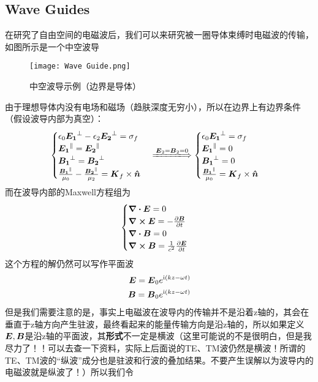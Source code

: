 \documentclass[14pt,oneside]{book}
\def \i{\mathrm{i}}
\def \E{\vb*{E}}
\def \B{\vb*{B}}
\begin{document}
\begin{large}
\subsection{Wave Guides}
在研究了自由空间的电磁波后，我们可以来研究被一圈导体束缚时电磁波的传输，如图所示是一个中空波导
\begin{figure}[H]
\centering
  \texttt{[image: Wave Guide.png]}
  \caption{中空波导示例（边界是导体）}
\end{figure}
由于理想导体内没有电场和磁场（趋肤深度无穷小），所以在边界上有边界条件（假设波导内部为真空）：
\begin{align}
	\begin{cases}
		\epsilon_0\vb*{E_1}^\perp-\epsilon_2\vb*{E_2}^\perp=\sigma_f\\
		\vb*{E_1}^\parallel=\vb*{E_2}^\parallel\\
		\vb*{B_1}^\perp=\vb*{B_2}^\perp\\
		\frac{\vb*{B_1}^\parallel}{\mu_0}-\frac{\vb*{B_2}^\parallel}{\mu_2}=\vb*{K}_f\times \vb*{\hat n}
	\end{cases}
	\xLongrightarrow[]{\E_2=\B_2=0}
		\begin{cases}
		\epsilon_0\vb*{E_1}^\perp=\sigma_f\\
		\vb*{E_1}^\parallel=0\\
		\vb*{B_1}^\perp=0\\
		\frac{\vb*{B_1}^\parallel}{\mu_0}=\vb*{K}_f\times \vb*{\hat n}
	\end{cases}
\end{align}
而在波导内部的Maxwell方程组为
\begin{align}
        \begin{cases}
                \div{\vb*{E}}=0\\
                \curl{\vb*{E}}=-\pdv{\vb*{B}}{t} \\
                \div{\vb*{B}}=0\\
                \curl{\vb*{B}}=\frac{1}{c^2}\pdv{\vb*{E}}{t}& 
        \end{cases}
\end{align}
这个方程的解仍然可以写作平面波
\begin{align}
	    \vb*{E}=\vb*{E}_0e^{\i(kz-\omega t)}\\
  \B=\B_0e^{\i(kz-\omega t)}	\notag
\end{align}
但是我们需要注意的是，事实上电磁波在波导内的传输并不是沿着z轴的，其会在垂直于z轴方向产生驻波，最终看起来的能量传输方向是沿z轴的，所以如果定义$\E,\B$是沿z轴的平面波，其\textbf{形式}不一定是横波（这里可能说的不是很明白，但是我尽力了！！可以去查一下资料，实际上后面说的TE、TM波仍然是横波！所谓的TE、TM波的“纵波”成分也是驻波和行波的叠加结果。不要产生误解以为波导内的电磁波就是纵波了！）所以我们令

\end{large}
\end{document}
